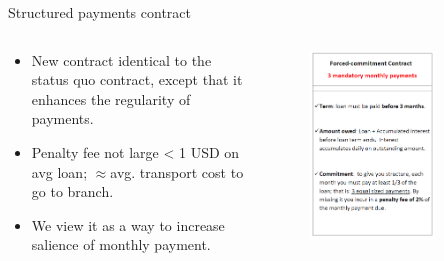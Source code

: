 \documentclass[9pt, aspectratio=169]{beamer}
\begin{document}
\begin{frame}{Structured payments contract}
\begin{columns}
\begin{column}{.45\textwidth}
   \begin{itemize}
       \vfill \item New contract identical to the status quo contract, except that it enhances the regularity of payments.
       \vspace{.2in}
       \vfill \item Penalty fee not large < 1 USD on avg loan; $\approx$avg. transport cost to go to branch.
       \vspace{.2in}
       \vfill \item We view it as a way to increase salience of monthly payment.
    \end{itemize}
    \end{column}
\begin{column}{.45\textwidth}
    \vspace{-.3in}
        \begin{figure}[H]
            \includegraphics[width=0.78\textwidth]{Figuras/fc_contract.png}
        \end{figure}
    \end{column}
    \end{columns}
\end{frame}
\end{document}
